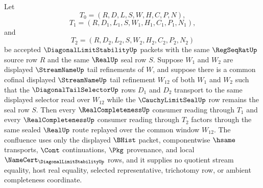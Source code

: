 \begin{theorem}
\label{thm:diagonal-limit-stability-cofinal-refinement-confluence}
Let
$$
T_0=(R,D,L,S,W,H,C,P,N),
$$
$$
T_1=(R,D_1,L_1,S,W_1,H_1,C_1,P_1,N_1),
$$
and
$$
T_2=(R,D_2,L_2,S,W_2,H_2,C_2,P_2,N_2)
$$
be accepted $\DiagonalLimitStabilityUp$ packets with the same $\RegSeqRatUp$ source row $R$ and the same $\RealUp$ seal row $S$. Suppose $W_1$ and $W_2$ are displayed $\StreamNameUp$ tail refinements of $W$, and suppose there is a common cofinal displayed $\StreamNameUp$ tail refinement $W_{12}$ of both $W_1$ and $W_2$ such that the $\DiagonalTailSelectorUp$ rows $D_1$ and $D_2$ transport to the same displayed selector read over $W_{12}$ while the $\CauchyLimitSealUp$ row remains the seal row $S$. Then every $\RealCompletenessUp$ consumer reading through $T_1$ and every $\RealCompletenessUp$ consumer reading through $T_2$ factors through the same sealed $\RealUp$ route replayed over the common window $W_{12}$. The confluence uses only the displayed $\BHist$ packet, componentwise $\hsame$ transports, $\Cont$ continuations, $\Pkg$ provenance, and local $\NameCert_{\DiagonalLimitStabilityUp}$ rows, and it supplies no quotient stream equality, host real equality, selected representative, trichotomy row, or ambient completeness coordinate.
\end{theorem}
